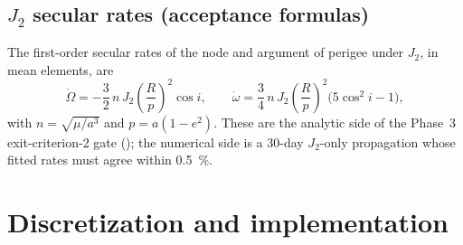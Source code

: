 \subsection{\texorpdfstring{$J_2$}{J2} secular rates (acceptance formulas)}

The first-order secular rates of the node and argument of perigee under
$J_2$, in mean elements, are~\cite{vallado2013}
\begin{equation}
  \dot{\Omega} = -\frac{3}{2}\, n\, J_2
    \left(\frac{R}{p}\right)^{\!2} \cos i,
  \qquad
  \dot{\omega} = \frac{3}{4}\, n\, J_2
    \left(\frac{R}{p}\right)^{\!2} \bigl(5\cos^2 i - 1\bigr),
  \label{eq:gravity:j2secular}
\end{equation}
with $n = \sqrt{\mu/a^3}$ and $p = a(1 - e^2)$. These are the analytic
side of the Phase~3 exit-criterion-2 gate
(); the numerical side is a 30-day $J_2$-only
propagation whose fitted rates must agree within \qty{0.5}{\percent}.

\section{Discretization and implementation}
\label{sec:gravity:implementation}

